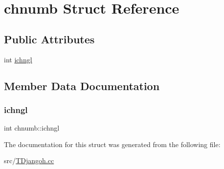 \hypertarget{structchnumb}{}\section{chnumb Struct Reference}
\label{structchnumb}
\subsection*{Public Attributes}
\begin{DoxyCompactItemize}
\item 
int \hyperlink{structchnumb_ae74f2b2adeb038da2e17c05bb10099aa}{ichngl}
\end{DoxyCompactItemize}


\subsection{Member Data Documentation}
\mbox{\label{structchnumb_ae74f2b2adeb038da2e17c05bb10099aa}} 
\subsubsection{\texorpdfstring{ichngl}{ichngl}}
{\footnotesize\ttfamily int chnumb\+::ichngl}



The documentation for this struct was generated from the following file\+:\begin{DoxyCompactItemize}
\item 
src/\hyperlink{_t_djangoh_8cc}{T\+Djangoh.\+cc}\end{DoxyCompactItemize}

